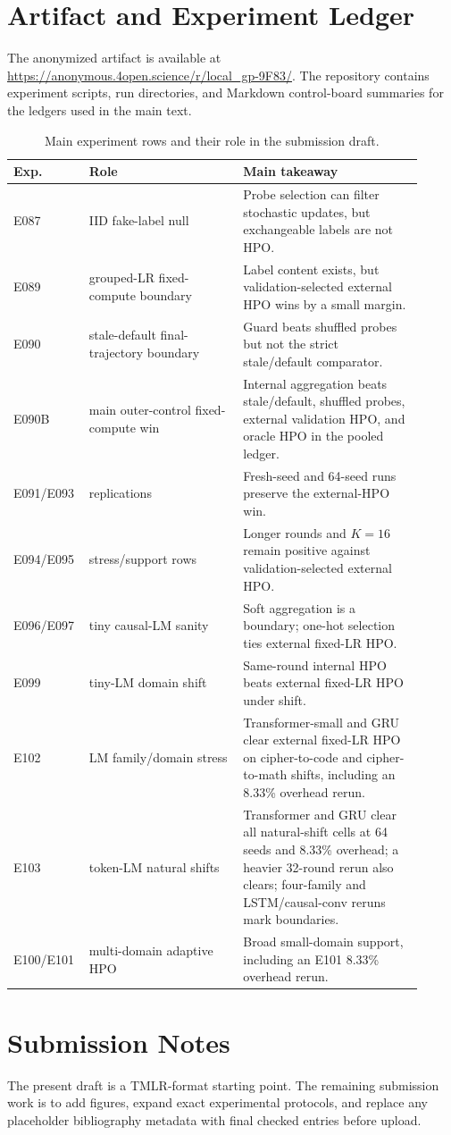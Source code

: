 \section{Artifact and Experiment Ledger}
\label{app:ledger}

The anonymized artifact is available at
\url{https://anonymous.4open.science/r/local_gp-9F83/}. The repository
contains experiment scripts, run directories, and Markdown control-board
summaries for the ledgers used in the main text.

\begin{table}[h]
\centering
\small
\caption{Main experiment rows and their role in the submission draft.}
\label{tab:appendix-ledger}
\begin{tabular}{@{}p{0.13\linewidth}p{0.36\linewidth}p{0.42\linewidth}@{}}
\toprule
Exp. & Role & Main takeaway \\
\midrule
E087 & IID fake-label null & Probe selection can filter stochastic updates, but exchangeable labels are not HPO. \\
E089 & grouped-LR fixed-compute boundary & Label content exists, but validation-selected external HPO wins by a small margin. \\
E090 & stale-default final-trajectory boundary & Guard beats shuffled probes but not the strict stale/default comparator. \\
E090B & main outer-control fixed-compute win & Internal aggregation beats stale/default, shuffled probes, external validation HPO, and oracle HPO in the pooled ledger. \\
E091/E093 & replications & Fresh-seed and 64-seed runs preserve the external-HPO win. \\
E094/E095 & stress/support rows & Longer rounds and $K=16$ remain positive against validation-selected external HPO. \\
E096/E097 & tiny causal-LM sanity & Soft aggregation is a boundary; one-hot selection ties external fixed-LR HPO. \\
E099 & tiny-LM domain shift & Same-round internal HPO beats external fixed-LR HPO under shift. \\
E102 & LM family/domain stress & Transformer-small and GRU clear external fixed-LR HPO on cipher-to-code and cipher-to-math shifts, including an 8.33\% overhead rerun. \\
E103 & token-LM natural shifts & Transformer and GRU clear all natural-shift cells at 64 seeds and 8.33\% overhead; a heavier 32-round rerun also clears; four-family and LSTM/causal-conv reruns mark boundaries. \\
E100/E101 & multi-domain adaptive HPO & Broad small-domain support, including an E101 8.33\% overhead rerun. \\
\bottomrule
\end{tabular}
\end{table}

\section{Submission Notes}

The present draft is a TMLR-format starting point. The remaining submission
work is to add figures, expand exact experimental protocols, and replace any
placeholder bibliography metadata with final checked entries before upload.
